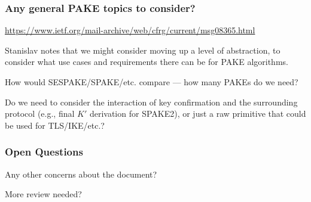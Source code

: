 \documentclass{beamer}
\begin{document}
\begin{frame}[fragile]
\frametitle{Any general PAKE topics to consider?}
\url{https://www.ietf.org/mail-archive/web/cfrg/current/msg08365.html}

Stanislav notes that we might consider moving up a level of abstraction,
to consider what use cases and requirements there can be for PAKE algorithms.

How would SESPAKE/SPAKE/etc. compare --- how many PAKEs do we need?

Do we need to consider the interaction of key confirmation and the
surrounding protocol (e.g., final $K'$ derivation for SPAKE2), or just
a raw primitive that could be used for TLS/IKE/etc.?
\end{frame}

\begin{frame}
\frametitle{Open Questions}

Any other concerns about the document?

More review needed?
\end{frame}
\end{document}
